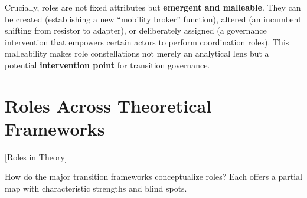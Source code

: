 \documentclass[../main.tex]{subfiles}
\begin{document}
Crucially, roles are not fixed attributes but \textbf{emergent and malleable}. They can be created (establishing a new ``mobility broker'' function), altered (an incumbent shifting from resistor to adapter), or deliberately assigned (a governance intervention that empowers certain actors to perform coordination roles). This malleability makes role constellations not merely an analytical lens but a potential \textbf{intervention point} for transition governance.


\section{Roles Across Theoretical Frameworks}[Roles in Theory]

How do the major transition frameworks conceptualize roles? Each offers a partial map with characteristic strengths and blind spots.
\end{document}
